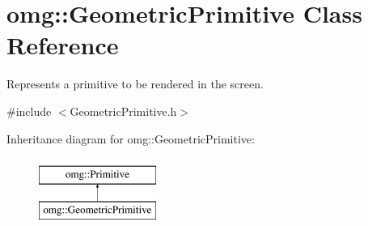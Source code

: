 \hypertarget{classomg_1_1_geometric_primitive}{}\section{omg\+::Geometric\+Primitive Class Reference}
\label{classomg_1_1_geometric_primitive}


Represents a primitive to be rendered in the screen.  




{\ttfamily \#include $<$Geometric\+Primitive.\+h$>$}

Inheritance diagram for omg\+::Geometric\+Primitive\+:\begin{figure}[H]
\begin{center}
\leavevmode
\includegraphics[height=2.000000cm]{classomg_1_1_geometric_primitive}
\end{center}
\end{figure}
